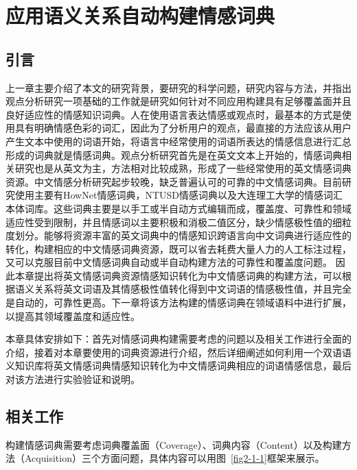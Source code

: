 \chapter{应用语义关系自动构建情感词典}
\label{ch2}

\section{引言}
\label{ch2:intro}
上一章主要介绍了本文的研究背景，要研究的科学问题，研究内容与方法，并指出观点分析研究一项基础的工作就是研究如何针对不同应用构建具有足够覆盖面并且良好适应性的情感知识词典。人在使用语言表达情感或观点时，最基本的方式是使用具有明确情感色彩的词汇，因此为了分析用户的观点，最直接的方法应该从用户产生文本中使用的词语开始，将语言中经常使用的词语所表达的情感信息进行汇总形成的词典就是情感词典。观点分析研究首先是在英文文本上开始的，情感词典相关研究也是从英文为主，方法相对比较成熟，形成了一些经常使用的英文情感词典资源。中文情感分析研究起步较晚，缺乏普遍认可的可靠的中文情感词典。目前研究使用主要有HowNet情感词典，NTUSD情感词典以及大连理工大学的情感词汇本体词库。这些词典主要是以手工或半自动方式编辑而成，覆盖度、可靠性和领域适应性受到限制，并且情感词以主要积极和消极二值区分，缺少情感极性值的细粒度划分。能够将资源丰富的英文词典中的情感知识跨语言向中文词典进行适应性的转化，构建相应的中文情感词典资源，既可以省去耗费大量人力的人工标注过程，又可以克服目前中文情感词典自动或半自动构建方法的可靠性和覆盖度问题。
因此本章提出将英文情感词典资源情感知识转化为中文情感词典的构建方法，可以根据语义关系将英文词语及其情感极性值转化得到中文词语的情感极性值，并且完全是自动的，可靠性更高。下一章将该方法构建的情感词典在领域语料中进行扩展，以提高其领域覆盖度和适应性。

本章具体安排如下：首先对情感词典构建需要考虑的问题以及相关工作进行全面的介绍，接着对本章要使用的词典资源进行介绍，然后详细阐述如何利用一个双语语义知识库将英文情感词典情感知识转化为中文情感词典相应的词语情感信息，最后对该方法进行实验验证和说明。

\section{相关工作}
构建情感词典需要考虑词典覆盖面（Coverage）、词典内容（Content）以及构建方法（Acquisition）三个方面问题，具体内容可以用图~\ref{fig2-1-1}框架来展示。

